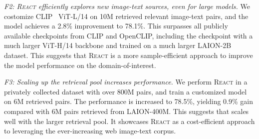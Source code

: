 \documentclass[10pt,twocolumn,letterpaper]{article}
\newcommand{\shortname}{\textsc{React}}
\begin{document}
{\it F2: \shortname{} efficiently explores new image-text sources, even for large models.}
We costomize CLIP~\cite{radford2021learning} ViT-L/14 on 10M retrieved relevant image-text pairs, and the model achieves a 2.8\% improvement to 78.1\%.  This surpasses all publicly available checkpoints from CLIP and OpenCLIP, including the checkpoint with a much larger ViT-H/14 backbone and trained on a much larger LAION-2B dataset.  This suggests that \shortname{} is a more sample-efficient approach to improve the model performance on the domain-of-interest.

{\it F3: Scaling up the retrieval pool increases performance.} We perform \shortname{} in a privately collected dataset with over 800M pairs, and train a customized model on 6M retrieved pairs. The performance is increased to 78.5\%, yielding 0.9\% gain compared with 6M pairs retrieved from LAION-400M. This suggests that  scales well with the larger retrieval pool.  It showcases  \shortname{} as a cost-efficient approach to leveraging the ever-increasing web image-text corpus.
\end{document}
